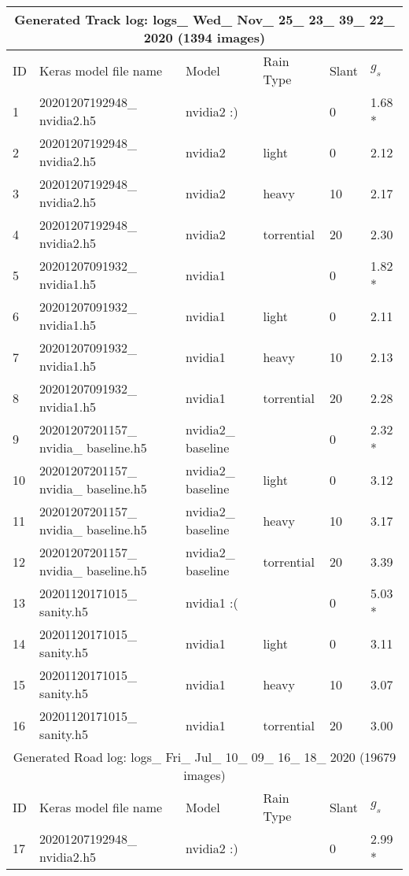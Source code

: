 \begin{table}[]
\begin{center}
\begin{tabular}{l l l l l l}
\multicolumn{6}{c}{Generated Track log: logs\_ Wed\_ Nov\_ 25\_ 23\_ 39\_ 22\_ 2020 (1394 images)} \\ \hline
ID & Keras model file name & Model & Rain Type & Slant & $g_s$ \\ \hline
1 & 20201207192948\_ nvidia2.h5 & nvidia2 :) &  & 0 & 1.68 * \\ \hline
2 & 20201207192948\_ nvidia2.h5 & nvidia2 & light & 0 & 2.12 \\ \hline
3 & 20201207192948\_ nvidia2.h5 & nvidia2 & heavy & 10 & 2.17 \\ \hline
4 & 20201207192948\_ nvidia2.h5 & nvidia2 & torrential & 20 & 2.30 \\ \hline
5 & 20201207091932\_ nvidia1.h5 & nvidia1 &  & 0 & 1.82 * \\ \hline
6 & 20201207091932\_ nvidia1.h5 & nvidia1 & light & 0 & 2.11 \\ \hline
7 & 20201207091932\_ nvidia1.h5 & nvidia1 & heavy & 10 & 2.13 \\ \hline
8 & 20201207091932\_ nvidia1.h5 & nvidia1 & torrential & 20 & 2.28 \\ \hline
9 & 20201207201157\_ nvidia\_ baseline.h5 & nvidia2\_ baseline &  & 0 & 2.32 * \\ \hline
10 & 20201207201157\_ nvidia\_ baseline.h5 & nvidia2\_ baseline & light & 0 & 3.12 \\ \hline
11 & 20201207201157\_ nvidia\_ baseline.h5 & nvidia2\_ baseline & heavy & 10 & 3.17 \\ \hline
12 & 20201207201157\_ nvidia\_ baseline.h5 & nvidia2\_ baseline & torrential & 20 & 3.39 \\ \hline
13 & 20201120171015\_ sanity.h5 & nvidia1 :( &  & 0 & 5.03 * \\ \hline
14 & 20201120171015\_ sanity.h5 & nvidia1 & light & 0 & 3.11 \\ \hline
15 & 20201120171015\_ sanity.h5 & nvidia1 & heavy & 10 & 3.07 \\ \hline
16 & 20201120171015\_ sanity.h5 & nvidia1 & torrential & 20 & 3.00 \\ \hline
\multicolumn{6}{c}{Generated Road log:  logs\_ Fri\_ Jul\_ 10\_ 09\_ 16\_ 18\_ 2020 (19679 images)} \\ \hline
ID & Keras model file name & Model & Rain Type & Slant & $g_s$ \\ \hline
17 & 20201207192948\_ nvidia2.h5 & nvidia2 :) &  & 0 & 2.99 * \\ \hline  %

\end{tabular}
\end{center}
\end{table}
